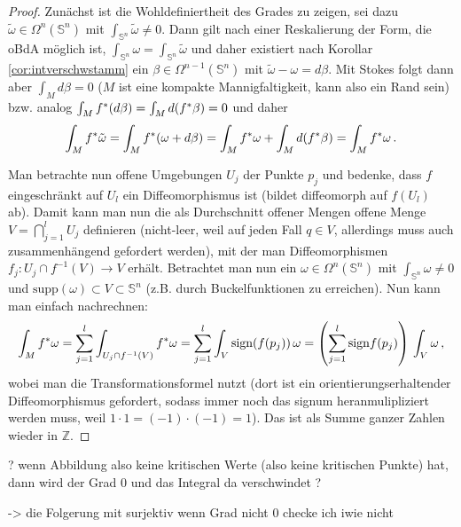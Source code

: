 \documentclass[../H_Analysis_main.tex]{subfiles}
\begin{document}
\begin{proof}
Zunächst ist die Wohldefiniertheit des Grades zu zeigen, sei dazu $\tilde{\omega} \in \Omega^n(\mathbb{S}^n)$ mit $\int_{\mathbb{S}^n} \tilde{\omega} \neq 0$. Dann gilt nach einer Reskalierung der Form, die oBdA möglich ist, $\int_{\mathbb{S}^n} \omega = \int_{\mathbb{S}^n} \tilde{\omega}$ und daher existiert nach Korollar \ref{cor:intverschwstamm} ein $\beta \in \Omega^{n - 1}(\mathbb{S}^n)$ mit $\tilde{\omega} - \omega = d\beta$. Mit Stokes folgt dann aber $\int_M d\beta = 0$ ($M$ ist eine kompakte Mannigfaltigkeit, kann also ein Rand sein) bzw. analog $\int_M f^* \qty(d\beta) = \int_M d\qty(f^*\beta) = 0$ und daher
\begin{equation*}
\int_M f^* \tilde{\omega} = \int_M f^*\qty(\omega + d\beta) = \int_M f^*\omega + \int_M d\qty(f^*\beta) = \int_M f^*\omega \, .
\end{equation*}


Man betrachte nun offene Umgebungen $U_j$ der Punkte $p_j$ und bedenke, dass $f$ eingeschränkt auf $U_l$ ein Diffeomorphismus ist (bildet diffeomorph auf $f(U_l)$ ab). Damit kann man nun die als Durchschnitt offener Mengen offene Menge $V = \bigcap_{j = 1}^l U_j$ definieren (nicht-leer, weil auf jeden Fall $q \in V$, allerdings muss auch zusammenhängend gefordert werden), mit der man Diffeomorphismen $f_j: U_j \cap f^{-1}(V) \rightarrow V$ erhält. Betrachtet man nun ein $\omega \in \Omega^n(\mathbb{S}^n)$ mit $\int_{\mathbb{S}^n} \omega \neq 0$ und $\text{supp}(\omega) \subset V \subset \mathbb{S}^n$ (z.B. durch Buckelfunktionen zu erreichen). Nun kann man einfach nachrechnen:
\begin{equation*}
\int_M f^*\omega = \sum_{j = 1}^l \int_{U_j \cap f^{-1}(V)} f^*\omega = \sum_{j = 1}^l \int_V \text{sign}\qty(f(p_j)) \, \omega = \qty(\sum_{j = 1}^l \text{sign} f(p_j)) \, \int_V \omega \, ,
\end{equation*}
wobei man die Transformationsformel nutzt (dort ist ein orientierungserhaltender Diffeomorphismus gefordert, sodass immer noch das signum heranmulipliziert werden muss, weil $1 \cdot 1 = (- 1) \cdot (- 1) = 1$). Das ist als Summe ganzer Zahlen wieder in $\mathbb{Z}$.
\end{proof}

? wenn Abbildung also keine kritischen Werte (also keine kritischen Punkte) hat, dann wird der Grad 0 und das Integral da verschwindet ?

-> die Folgerung mit surjektiv wenn Grad nicht 0 checke ich iwie nicht
\end{document}
